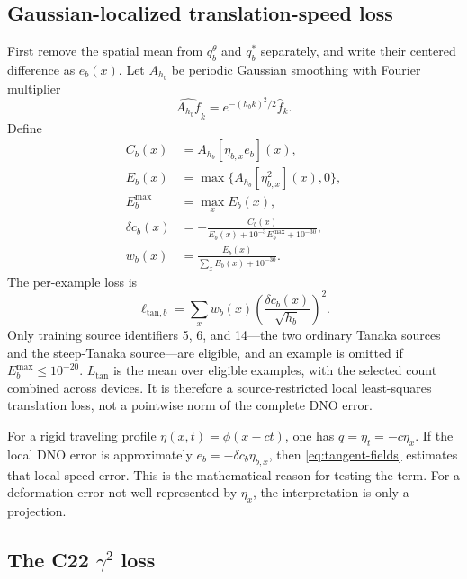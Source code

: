 \documentclass[11pt]{article}
\begin{document}
\subsection{Gaussian-localized translation-speed loss}

First remove the spatial mean from $q_b^\theta$ and $q_b^*$ separately, and
write their centered difference as $e_b(x)$.  Let $A_{h_b}$ be periodic
Gaussian smoothing with Fourier multiplier
\begin{equation}
  \widehat{A_{h_b}f}_k=e^{-(h_bk)^2/2}\widehat f_k.
\end{equation}
Define
\begin{align}
  C_b(x)&=A_{h_b}[\eta_{b,x}e_b](x),\\
  E_b(x)&=\max\{A_{h_b}[\eta_{b,x}^2](x),0\},\\
  E_b^{\max}&=\max_xE_b(x),\\
  \delta c_b(x)&=-\frac{C_b(x)}
  {E_b(x)+10^{-3}E_b^{\max}+10^{-30}},\\
  w_b(x)&=\frac{E_b(x)}{\sum_xE_b(x)+10^{-30}}.
  \label{eq:tangent-fields}
\end{align}
The per-example loss is
\begin{equation}
  \ell_{\mathrm{tan},b}
  =\sum_xw_b(x)\left(\frac{\delta c_b(x)}{\sqrt{h_b}}\right)^2.
  \label{eq:tangent-loss}
\end{equation}
Only training source identifiers 5, 6, and 14---the two ordinary Tanaka
sources and the steep-Tanaka source---are eligible, and an example is omitted
if $E_b^{\max}\leq10^{-20}$.  $L_{\mathrm{tan}}$ is the mean over eligible
examples, with the selected count combined across devices.  It is therefore a
source-restricted local least-squares translation loss, not a pointwise norm
of the complete DNO error.

For a rigid traveling profile $\eta(x,t)=\phi(x-ct)$, one has
$q=\eta_t=-c\eta_x$.  If the local DNO error is approximately
$e_b=-\delta c_b\eta_{b,x}$, then \eqref{eq:tangent-fields} estimates that
local speed error.  This is the mathematical reason for testing the term.
For a deformation error not well represented by $\eta_x$, the interpretation
is only a projection.

\subsection{The C22 \texorpdfstring{$\gamma^2$}{gamma-squared} loss}
\end{document}
